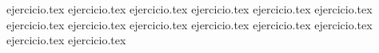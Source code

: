 
\begin{enumerate}
    {ejercicio.tex}
    {ejercicio.tex}
    {ejercicio.tex}
    {ejercicio.tex}
    {ejercicio.tex}
    {ejercicio.tex}
    {ejercicio.tex}
    {ejercicio.tex}
    {ejercicio.tex}
    {ejercicio.tex}
    {ejercicio.tex}
    {ejercicio.tex}
    {ejercicio.tex}
    {ejercicio.tex}
\end{enumerate}
